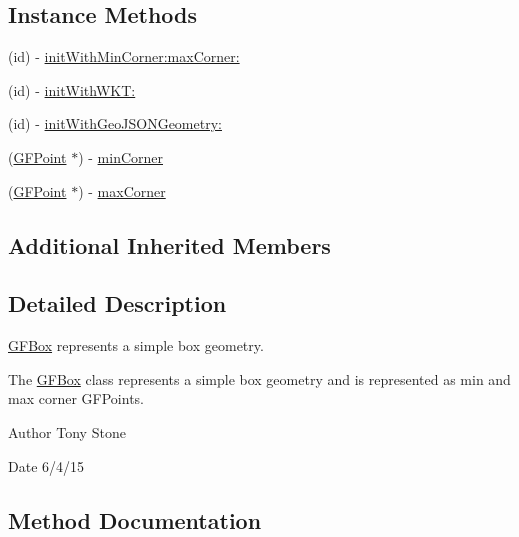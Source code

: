 \subsection*{Instance Methods}
\begin{DoxyCompactItemize}
\item 
(id) -\/ \hyperlink{interface_g_f_box_a639abb389fb3234d29b7315c3d8416e8}{init\+With\+Min\+Corner\+:max\+Corner\+:}
\item 
(id) -\/ \hyperlink{interface_g_f_box_a7391861070f3ef70458b95e2c5a96a62}{init\+With\+W\+K\+T\+:}
\item 
(id) -\/ \hyperlink{interface_g_f_box_acb2fca8524a96ab32f7e20882042b9ce}{init\+With\+Geo\+J\+S\+O\+N\+Geometry\+:}
\item 
(\hyperlink{interface_g_f_point}{G\+F\+Point} $\ast$) -\/ \hyperlink{interface_g_f_box_a102f7c53d4871e5431e813a2cb43eccd}{min\+Corner}
\item 
(\hyperlink{interface_g_f_point}{G\+F\+Point} $\ast$) -\/ \hyperlink{interface_g_f_box_ac2926a7b4f4f826f769a6f59aecd6f64}{max\+Corner}
\end{DoxyCompactItemize}
\subsection*{Additional Inherited Members}


\subsection{Detailed Description}
\hyperlink{interface_g_f_box}{G\+F\+Box} represents a simple box geometry. 

The \hyperlink{interface_g_f_box}{G\+F\+Box} class represents a simple box geometry and is represented as min and max corner G\+F\+Points.

\begin{DoxyAuthor}{Author}
Tony Stone 
\end{DoxyAuthor}
\begin{DoxyDate}{Date}
6/4/15 
\end{DoxyDate}


\subsection{Method Documentation}
\hypertarget{interface_g_f_box_a639abb389fb3234d29b7315c3d8416e8}{}
